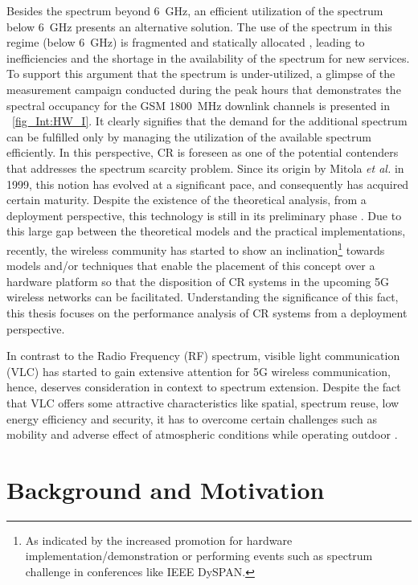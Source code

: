 Besides the spectrum beyond \SI{6}{GHz}, an efficient utilization of the spectrum below \SI{6}{GHz} presents an alternative solution. The use of the spectrum in this regime (below \SI{6}{GHz}) is fragmented and statically allocated \cite{Mchen05, Mchen07}, leading to inefficiencies and the shortage in the availability of the spectrum for new services. To support this argument that the spectrum is under-utilized, a glimpse of the measurement campaign conducted during the peak hours that demonstrates the spectral occupancy for the GSM \SI{1800}{MHz} downlink channels is presented in \figurename~\ref{fig_Int:HW_I}. It clearly signifies that the demand for the additional spectrum can be fulfilled only by managing the utilization of the available spectrum efficiently. In this perspective, CR is foreseen as one of the potential contenders that addresses the spectrum scarcity problem. Since its origin by Mitola \textit{et al.} in 1999, this notion has evolved at a significant pace, and consequently has acquired certain maturity. Despite the existence of the theoretical analysis, from a deployment perspective, this technology is still in its preliminary phase \cite{Pawe11}. Due to this large gap between the theoretical models and the practical implementations, recently, the wireless community has started to show an inclination\footnote{As indicated by the increased promotion for hardware implementation/demonstration or performing events such as spectrum challenge in conferences like IEEE DySPAN.} towards models and/or techniques that enable the placement of this concept over a hardware platform so that the disposition of CR systems in the upcoming 5G wireless networks can be facilitated. Understanding the significance of this fact, this thesis focuses on the performance analysis of CR systems from a deployment perspective. 

In contrast to the Radio Frequency (RF) spectrum, visible light communication (VLC) has started to gain extensive attention for 5G wireless communication, hence, deserves consideration in context to spectrum extension. Despite the fact that VLC offers some attractive characteristics like spatial, spectrum reuse, low energy efficiency and security, it has to overcome certain challenges such as mobility and adverse effect of atmospheric conditions while operating outdoor \cite{Wu14}. 


\section{Background and Motivation}
\label{sec:mot}

